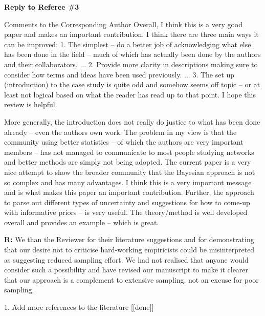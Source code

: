 \documentclass[12pt]{letter}
\newenvironment{refquote}{\bigskip \begin{it}}{\end{it}\smallskip}
\begin{document}
\begin{itemize}
{\Large \bf Reply to Referee \#3}

	\begin{refquote}
		Comments to the Corresponding Author
		Overall, I think this is a very good paper and makes an important contribution.  I think there are three main ways it can be improved: 1.      The simplest – do a better job of acknowledging what else has been done in the field – much of which has actually been done by the authors and their collaborators. ... 2.      Provide more clarity in descriptions making sure to consider how terms and ideas have been used previously. ... 3.      The set up (introduction) to the case study is quite odd and somehow seems off topic – or at least not logical based on what the reader has read up to that point.
		I hope this review is helpful.  


		More generally, the introduction does not really do justice to what has been done already – even the authors own work.  The problem in my view is that the community using better statistics – of which the authors are very important members – has not managed to communicate to most people studying networks and better methods are simply not being adopted.  The current paper is a very nice attempt to show the broader community that the Bayesian approach is not so complex and has many advantages.  I think this is a very important message and is what makes this paper an important contribution.  Further, the approach to parse out different types of uncertainty and suggestions for how to come-up with informative priors – is very useful.  The theory/method is well developed overall and provides an example – which is great.

		\end{refquote}

		\textbf{R:} We than the Reviewer for their literature suggestions and for demonstrating that our desire not to criticise hard-working empiricists could be misinterpreted as suggesting reduced sampling effort. We had not realised that anyone would consider such a possibility and have revised our manuscript to make it clearer that our approach is a complement to extensive sampling, not an excuse for poor sampling. 


	1. Add more references to the literature [[done]]


\end{itemize}
\end{document}
